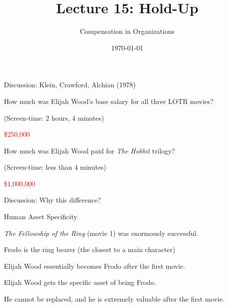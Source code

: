 \documentclass[aspectratio=169,usenames,dvipsnames]{beamer}
\title[diss]{Lecture 15: Hold-Up} %
\author{Compensation in Organizations} %
\institute[shortinst]{Jacob Kohlhepp}
\date{\today} %
\newenvironment{wideitemize}{\itemize\addtolength{\itemsep}{10pt}}{\enditemize}
\begin{document}
\begin{frame}
\titlepage %

\end{frame}

\begin{frame}
\centering
    \huge Discussion: Klein, Crawford, Alchian (1978)

\end{frame}


\begin{frame}
\centering
    \huge How much was Elijah Wood's base salary for all three LOTR movies?
    
    \pause
\large (Screen-time: 2 hours, 4 minutes)

\centering
\pause \huge \textcolor{red}{\$250,000}

\end{frame}


\begin{frame}
\centering
    \huge How much was Elijah Wood paid for \textit{The Hobbit} trilogy?

    \pause
\large (Screen-time: less than 4 minutes)

\pause 
\huge \textcolor{red}{\$1,000,000}
\end{frame}


\begin{frame}
\centering
    \huge Discussion: Why this difference?
\end{frame}

\begin{frame}{Human Asset Specificity}
\begin{wideitemize}
    \item \textit{The Fellowship of the Ring} (movie 1) was enormously successful.
    \item Frodo is the ring bearer (the closest to a main character)
    \item Elijah Wood essentially becomes Frodo after the first movie.
    \item Elijah Wood gets the specific asset of being Frodo.
    \item He cannot be replaced, and he is extremely valuable after the first movie.
\end{wideitemize}
    
\end{frame}
\end{document}
